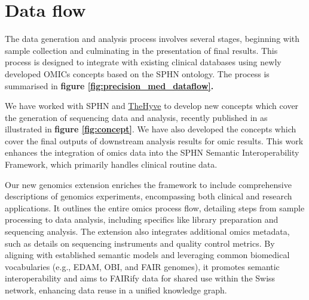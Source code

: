 \section{Data flow}
\label{data_flow_sec}

The data generation and analysis process involves several stages, beginning with sample collection and culminating in the presentation of final results. 
This process is designed to integrate  with existing clinical databases using newly developed OMICs concepts based on the SPHN ontology.
The process is summarised in 
\textbf{figure 
\ref{fig:precision_med_dataflow}.}

We have worked with SPHN and 
\href{https://www.thehyve.nl/articles/bridging-clinical-and-genomics-knowledge}{TheHyve} to develop new concepts which cover the generation of sequencing data and analysis, recently published in \citet{van2023bridging} as illustrated in
\textbf{figure 
\ref{fig:concept}}.
We have also developed the concepts which cover the final outputs of downstream analysis results for omic results.
This work enhances the integration of omics data into the SPHN Semantic Interoperability Framework, which primarily handles clinical routine data. 

Our new genomics extension enriches the framework to include comprehensive descriptions of genomics experiments, encompassing both clinical and research applications. 
It outlines the entire omics process flow, detailing steps from sample processing to data analysis, including specifics like library preparation and sequencing analysis. 
The extension also integrates additional omics metadata, such as details on sequencing instruments and quality control metrics. By aligning with established semantic models and leveraging common biomedical vocabularies (e.g., EDAM, OBI, and FAIR genomes), it promotes semantic interoperability and aims to FAIRify data for shared use within the Swiss network, enhancing data reuse in a unified knowledge graph.

